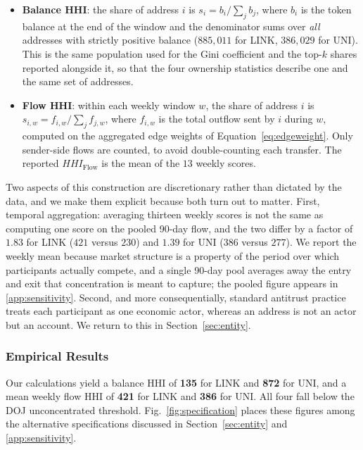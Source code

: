 \documentclass[final,5p,times]{elsarticle}
\begin{document}
\begin{itemize}
    \item \textbf{Balance HHI}: the share of address $i$ is
    $s_i = b_i / \sum_j b_j$, where $b_i$ is the token balance at the end of
    the window and the denominator sums over \emph{all} addresses with
    strictly positive balance ($885{,}011$ for LINK, $386{,}029$ for UNI).
    This is the same population used for the Gini coefficient and the
    top-$k$ shares reported alongside it, so that the four ownership
    statistics describe one and the same set of addresses.
    \item \textbf{Flow HHI}: within each weekly window $w$, the share of
    address $i$ is $s_{i,w} = f_{i,w} / \sum_j f_{j,w}$, where $f_{i,w}$ is
    the total outflow sent by $i$ during $w$, computed on the aggregated
    edge weights of Equation~\ref{eq:edgeweight}. Only sender-side flows are
    counted, to avoid double-counting each transfer. The reported
    $HHI_{\text{Flow}}$ is the mean of the $13$ weekly scores.
\end{itemize}

Two aspects of this construction are discretionary rather than dictated by
the data, and we make them explicit because both turn out to matter. First,
temporal aggregation: averaging thirteen weekly scores is not the same as
computing one score on the pooled 90-day flow, and the two differ by a factor
of $1.83$ for LINK ($421$ versus $230$) and $1.39$ for UNI ($386$ versus
$277$). We report the weekly mean because market structure is a property of
the period over which participants actually compete, and a single 90-day pool
averages away the entry and exit that concentration is meant to capture; the
pooled figure appears in \ref{app:sensitivity}. Second, and more
consequentially, standard antitrust practice treats each participant as one
economic actor, whereas an address is not an actor but an account. We return
to this in Section~\ref{sec:entity}.

\subsubsection{Empirical Results}
Our calculations yield a balance HHI of \textbf{135} for LINK and
\textbf{872} for UNI, and a mean weekly flow HHI of \textbf{421} for LINK and
\textbf{386} for UNI. All four fall below the DOJ unconcentrated threshold.
Fig.~\ref{fig:specification} places these figures among the alternative
specifications discussed in Section~\ref{sec:entity} and
\ref{app:sensitivity}.
\end{document}

